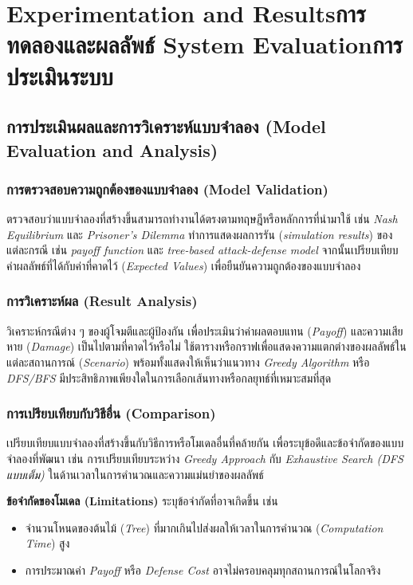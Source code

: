 \chapter{\ifproject%
\ifenglish Experimentation and Results\else การทดลองและผลลัพธ์\fi
\else%
\ifenglish System Evaluation\else การประเมินระบบ\fi
\fi}

\section{การประเมินผลและการวิเคราะห์แบบจำลอง (Model Evaluation and Analysis)}

\subsection{การตรวจสอบความถูกต้องของแบบจำลอง (Model Validation)}
ตรวจสอบว่าแบบจำลองที่สร้างขึ้นสามารถทำงานได้ตรงตามทฤษฎีหรือหลักการที่นำมาใช้ เช่น \textit{Nash Equilibrium} และ \textit{Prisoner’s Dilemma}  
ทำการแสดงผลการรัน (\textit{simulation results}) ของแต่ละกรณี เช่น \textit{payoff function} และ \textit{tree-based attack-defense model}  
จากนั้นเปรียบเทียบค่าผลลัพธ์ที่ได้กับค่าที่คาดไว้ (\textit{Expected Values}) เพื่อยืนยันความถูกต้องของแบบจำลอง

\subsection{การวิเคราะห์ผล (Result Analysis)}
วิเคราะห์กรณีต่าง ๆ ของผู้โจมตีและผู้ป้องกัน เพื่อประเมินว่าค่าผลตอบแทน (\textit{Payoff}) และความเสียหาย (\textit{Damage}) เป็นไปตามที่คาดไว้หรือไม่  
ใช้ตารางหรือกราฟเพื่อแสดงความแตกต่างของผลลัพธ์ในแต่ละสถานการณ์ (\textit{Scenario})  
พร้อมทั้งแสดงให้เห็นว่าแนวทาง \textit{Greedy Algorithm} หรือ \textit{DFS/BFS} มีประสิทธิภาพเพียงใดในการเลือกเส้นทางหรือกลยุทธ์ที่เหมาะสมที่สุด

\subsection{การเปรียบเทียบกับวิธีอื่น (Comparison)}
เปรียบเทียบแบบจำลองที่สร้างขึ้นกับวิธีการหรือโมเดลอื่นที่คล้ายกัน เพื่อระบุข้อดีและข้อจำกัดของแบบจำลองที่พัฒนา เช่น  
การเปรียบเทียบระหว่าง \textit{Greedy Approach} กับ \textit{Exhaustive Search (DFS แบบเต็ม)} ในด้านเวลาในการคำนวณและความแม่นยำของผลลัพธ์  

\textbf{ข้อจำกัดของโมเดล (Limitations)}  
ระบุข้อจำกัดที่อาจเกิดขึ้น เช่น
\begin{itemize}
  \item จำนวนโหนดของต้นไม้ (\textit{Tree}) ที่มากเกินไปส่งผลให้เวลาในการคำนวณ (\textit{Computation Time}) สูง
  \item การประมาณค่า \textit{Payoff} หรือ \textit{Defense Cost} อาจไม่ครอบคลุมทุกสถานการณ์ในโลกจริง
\end{itemize}

